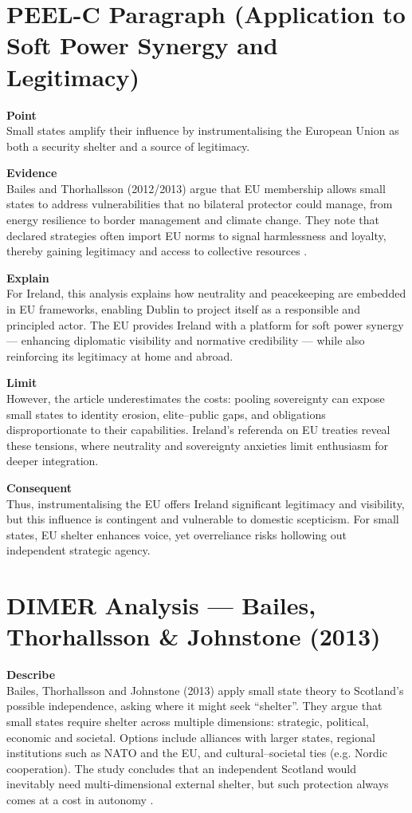 \section*{PEEL-C Paragraph (Application to Soft Power Synergy and Legitimacy)}

\textbf{Point} \\
Small states amplify their influence by instrumentalising the European Union as both a security shelter and a source of legitimacy.  

\textbf{Evidence} \\
Bailes and Thorhallsson (2012/2013) argue that EU membership allows small states to address vulnerabilities that no bilateral protector could manage, from energy resilience to border management and climate change. They note that declared strategies often import EU norms to signal harmlessness and loyalty, thereby gaining legitimacy and access to collective resources \parencite{BAILES_2012}.  

\textbf{Explain} \\
For Ireland, this analysis explains how neutrality and peacekeeping are embedded in EU frameworks, enabling Dublin to project itself as a responsible and principled actor. The EU provides Ireland with a platform for soft power synergy — enhancing diplomatic visibility and normative credibility — while also reinforcing its legitimacy at home and abroad.  

\textbf{Limit} \\
However, the article underestimates the costs: pooling sovereignty can expose small states to identity erosion, elite–public gaps, and obligations disproportionate to their capabilities. Ireland’s referenda on EU treaties reveal these tensions, where neutrality and sovereignty anxieties limit enthusiasm for deeper integration.  

\textbf{Consequent} \\
Thus, instrumentalising the EU offers Ireland significant legitimacy and visibility, but this influence is contingent and vulnerable to domestic scepticism. For small states, EU shelter enhances voice, yet overreliance risks hollowing out independent strategic agency.  


\section*{DIMER Analysis — Bailes, Thorhallsson \& Johnstone (2013)}

\textbf{Describe} \\
Bailes, Thorhallsson and Johnstone (2013) apply small state theory to Scotland’s possible independence, asking where it might seek ``shelter''. They argue that small states require shelter across multiple dimensions: strategic, political, economic and societal. Options include alliances with larger states, regional institutions such as NATO and the EU, and cultural–societal ties (e.g. Nordic cooperation). The study concludes that an independent Scotland would inevitably need multi-dimensional external shelter, but such protection always comes at a cost in autonomy \parencite{BAILES_2013}.

